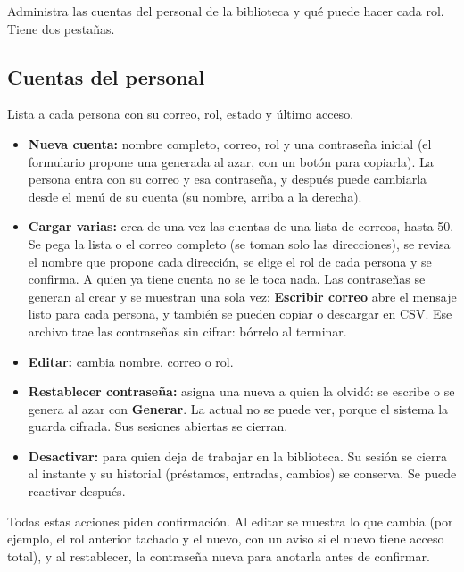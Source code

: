 \documentclass[11pt,a4paper]{report}
\begin{document}

Administra las cuentas del personal de la biblioteca y qué puede hacer
cada rol. Tiene dos pestañas.

\subsection{Cuentas del personal}

Lista a cada persona con su correo, rol, estado y último acceso.


\begin{itemize}
  \item \textbf{Nueva cuenta:} nombre completo, correo, rol y una
  contraseña inicial (el formulario propone una generada al azar, con un botón para copiarla). La persona
  entra con su correo y esa contraseña, y después puede cambiarla desde
  el menú de su cuenta (su nombre, arriba a la derecha).
  \item \textbf{Cargar varias:} crea de una vez las cuentas de una lista de
  correos, hasta 50. Se pega la lista o el correo completo (se toman solo las
  direcciones), se revisa el nombre que propone cada dirección, se elige el rol de
  cada persona y se confirma. A quien ya tiene cuenta no se le toca nada. Las
  contraseñas se generan al crear y se muestran una sola vez: \textbf{Escribir
  correo} abre el mensaje listo para cada persona, y también se pueden copiar o
  descargar en CSV. Ese archivo trae las contraseñas sin cifrar: bórrelo al terminar.
  \item \textbf{Editar:} cambia nombre, correo o rol.
  \item \textbf{Restablecer contraseña:} asigna una nueva a quien la
  olvidó: se escribe o se genera al azar con \textbf{Generar}. La actual no
  se puede ver, porque el sistema la guarda cifrada. Sus sesiones abiertas
  se cierran.
  \item \textbf{Desactivar:} para quien deja de trabajar en la
  biblioteca. Su sesión se cierra al instante y su historial (préstamos,
  entradas, cambios) se conserva. Se puede reactivar después.
\end{itemize}

Todas estas acciones piden confirmación. Al editar se muestra lo que
cambia (por ejemplo, el rol anterior tachado y el nuevo, con un aviso si
el nuevo tiene acceso total), y al restablecer, la contraseña nueva para
anotarla antes de confirmar.
\end{document}
